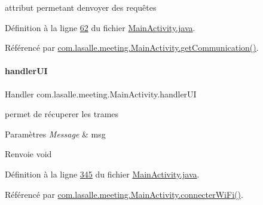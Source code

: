 attribut permetant d\textquotesingle{}envoyer des requêtes 



Définition à la ligne \hyperlink{_main_activity_8java_source_l00062}{62} du fichier \hyperlink{_main_activity_8java_source}{Main\+Activity.\+java}.



Référencé par \hyperlink{_main_activity_8java_source_l00479}{com.\+lasalle.\+meeting.\+Main\+Activity.\+get\+Communication()}.

\mbox{\label{classcom_1_1lasalle_1_1meeting_1_1_main_activity_a7cf3c4cd95f0f7cb43c077937f80ab8c}} 
\paragraph{\texorpdfstring{handler\+UI}{handlerUI}}
{\footnotesize\ttfamily Handler com.\+lasalle.\+meeting.\+Main\+Activity.\+handler\+UI\hspace{0.3cm}{\ttfamily [private]}}



permet de récuperer les trames 


\begin{DoxyParams}{Paramètres}
{\em Message} & msg \\
\hline
\end{DoxyParams}
\begin{DoxyReturn}{Renvoie}
void 
\end{DoxyReturn}


Définition à la ligne \hyperlink{_main_activity_8java_source_l00345}{345} du fichier \hyperlink{_main_activity_8java_source}{Main\+Activity.\+java}.



Référencé par \hyperlink{_main_activity_8java_source_l00185}{com.\+lasalle.\+meeting.\+Main\+Activity.\+connecter\+Wi\+Fi()}.

\mbox{\label{classcom_1_1lasalle_1_1meeting_1_1_main_activity_aab6810c357c5c87b60466bd82b691f98}} 
